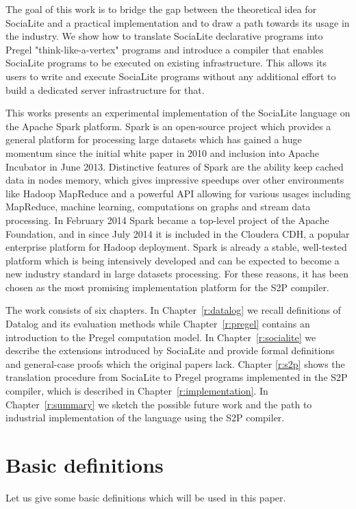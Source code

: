 \documentclass{pracamgr}
\theoremstyle{plain}
\theoremstyle{definition}
\theoremstyle{remark}
\begin{document}
The goal of this work is to bridge the gap between the theoretical idea for SociaLite and a practical implementation and to draw a path towards its usage in the industry. We show how to translate SociaLite declarative programs into Pregel "think-like-a-vertex" programs and introduce a compiler that enables SociaLite programs to be executed on existing infrastructure. This allows its users to write and execute SociaLite programs without any additional effort to build a dedicated server infrastructure for that.

This works presents an experimental implementation of the SociaLite language on the Apache Spark platform. Spark is an open-source project which provides a general platform for processing large datasets which has gained a huge momentum since the initial white paper in 2010 \cite{spark} and inclusion into Apache Incubator in June 2013. Distinctive features of Spark are the ability keep cached data in nodes memory, which gives impressive speedups over other environments like Hadoop MapReduce and a powerful API allowing for various usages including MapReduce, machine learning, computations on graphs and stream data processing. In February 2014 Spark became a top-level project of the Apache Foundation, and in since July 2014 it is included in the Cloudera CDH, a popular enterprise platform for Hadoop deployment. Spark is already a stable, well-tested platform which is being intensively developed and can be expected to become a new industry standard in large datasets processing. For these reasons, it has been chosen as the most promising implementation platform for the S2P compiler.

The work consists of six chapters. In Chapter~\ref{r:datalog} we recall definitions of Datalog and its evaluation methods while Chapter~\ref{r:pregel} contains an introduction to the Pregel computation model. In Chapter~\ref{r:socialite} we describe the extensions introduced by SociaLite and provide formal definitions and general-case proofs which the original papers lack. Chapter \ref{r:s2p} shows the translation procedure from SociaLite to Pregel programs implemented in the S2P compiler, which is described in Chapter~\ref{r:implementation}. In Chapter~\ref{r:summary} we sketch the possible future work and the path to industrial implementation of the language using the S2P compiler.

\section{Basic definitions}\label{r:basicdefs}
Let us give some basic definitions which will be used in this paper.
\end{document}
